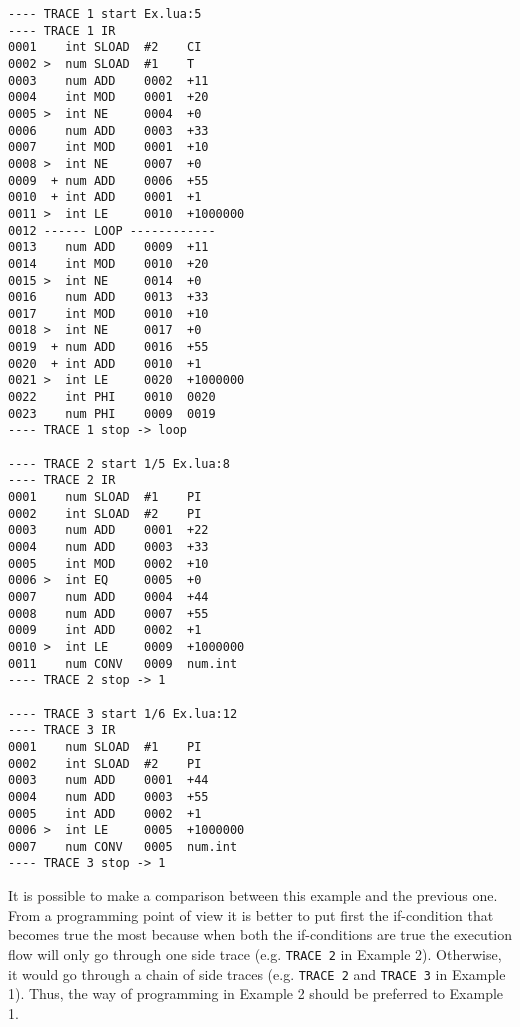 \begin{multicols}{2}
\begin{lstlisting}[style=DumpStyle]
---- TRACE 1 start Ex.lua:5
---- TRACE 1 IR
0001    int SLOAD  #2    CI
0002 >  num SLOAD  #1    T
0003    num ADD    0002  +11 
0004    int MOD    0001  +20 
0005 >  int NE     0004  +0  
0006    num ADD    0003  +33 
0007    int MOD    0001  +10 
0008 >  int NE     0007  +0  
0009  + num ADD    0006  +55 
0010  + int ADD    0001  +1  
0011 >  int LE     0010  +1000000
0012 ------ LOOP ------------
0013    num ADD    0009  +11 
0014    int MOD    0010  +20 
0015 >  int NE     0014  +0  
0016    num ADD    0013  +33 
0017    int MOD    0010  +10 
0018 >  int NE     0017  +0  
0019  + num ADD    0016  +55 
0020  + int ADD    0010  +1  
0021 >  int LE     0020  +1000000
0022    int PHI    0010  0020
0023    num PHI    0009  0019
---- TRACE 1 stop -> loop

---- TRACE 2 start 1/5 Ex.lua:8
---- TRACE 2 IR
0001    num SLOAD  #1    PI
0002    int SLOAD  #2    PI
0003    num ADD    0001  +22 
0004    num ADD    0003  +33 
0005    int MOD    0002  +10 
0006 >  int EQ     0005  +0  
0007    num ADD    0004  +44 
0008    num ADD    0007  +55 
0009    int ADD    0002  +1  
0010 >  int LE     0009  +1000000
0011    num CONV   0009  num.int
---- TRACE 2 stop -> 1

---- TRACE 3 start 1/6 Ex.lua:12
---- TRACE 3 IR
0001    num SLOAD  #1    PI
0002    int SLOAD  #2    PI
0003    num ADD    0001  +44 
0004    num ADD    0003  +55 
0005    int ADD    0002  +1  
0006 >  int LE     0005  +1000000
0007    num CONV   0005  num.int
---- TRACE 3 stop -> 1
\end{lstlisting}
\end{multicols}

\noindent
It is possible to make a comparison between this example and the previous one. From a programming point of view it is better to put first the if-condition that becomes true the most because when both the if-conditions are true the execution flow will only go through one side trace (e.g. \texttt{TRACE 2} in Example 2). Otherwise, it would go through a chain of side traces (e.g. \texttt{TRACE 2} and \texttt{TRACE 3} in Example 1). Thus, the way of programming in Example 2 should be preferred to Example 1.

